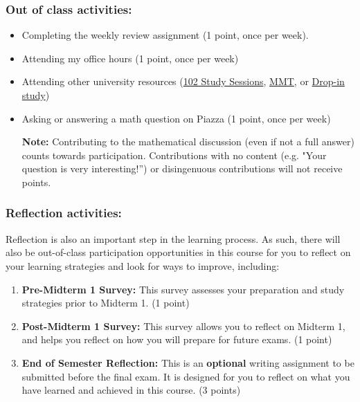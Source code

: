 \documentclass[11pt]{article}
\begin{document}
\vspace{-2em}
\subsubsection*{Out of class activities:}
\begin{itemize}[]
    \item Completing the weekly review assignment (1 point, once per week).
    \item Attending my office hours (1 point, once per week)
    \item Attending other university resources (\hyperlink{subsec:ss}{102 Study Sessions}, \hyperlink{subsec:MMT}{MMT}, or \href{https://oasus.rice.edu/drop-in}{Drop-in study})
    \item Asking or answering a math question on Piazza (1 point, once per week)

    \vspace{.5em}
    \textbf{Note:} Contributing to the mathematical discussion (even if not a full answer) counts towards participation. Contributions with no content (e.g. "Your question is very interesting!”) or disingenuous contributions will not receive points.
\end{itemize}


\subsubsection*{Reflection activities:}

Reflection is also an important step in the learning process.  As such, there will also be out-of-class participation opportunities in this course for you to reflect on your learning strategies and look for ways to improve, including:

\begin{enumerate}[]
    \item \textbf{Pre-Midterm 1 Survey:} This survey assesses your preparation and study strategies prior to Midterm 1.  (1 point)

    \item \textbf{Post-Midterm 1 Survey:} This survey allows you to reflect on Midterm 1, and helps you reflect on how you will prepare for future exams.  (1 point)
    
    \item \textbf{End of Semester Reflection:} \label{endofqr} This is an \textbf{optional} writing assignment to be submitted before the final exam. It is designed for you to reflect on what you have learned and achieved in this course. (3 points)

\end{enumerate}
\end{document}

